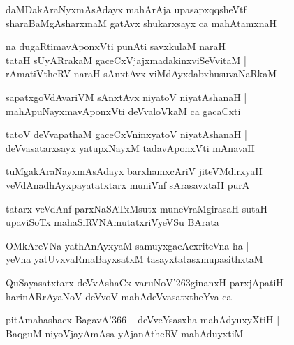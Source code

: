 \documentclass[twoside,12pt,openright]{book}
\def\S{\char'263}
\newcounter{shloka}[chapter]
\begin{document}
\begin{shloka}
daMDakAraNyxmAsAdayx mahArAja upasapxqqsheVtf |\\
sharaBaMgAsharxmaM gatAvx shukarxsayx ca mahAtamxnaH
\end{shloka}

\begin{shloka}
na dugaRtimavAponxVti punAti savxkulaM naraH ||\\
tataH sUyARrakaM gaceCxVjajxmadakinxviSeVvitaM |\\
rAmatiVtheRV naraH sAnxtAvx viMdAyxdabxhusuvaNaRkaM 
\end{shloka}

\begin{shloka}
sapatxgoVdAvariVM sAnxtAvx niyatoV niyatAshanaH |\\
mahApuNayxmavAponxVti deVvaloVkaM ca gacaCxti 
\end{shloka}

\begin{shloka}
tatoV deVvapathaM gaceCxVninxyatoV niyatAshanaH |\\
deVvasatarxsayx yatupxNayxM tadavAponxVti mAnavaH 
\end{shloka}

\begin{shloka}
tuMgakAraNayxmAsAdayx barxhamxcAriV jiteVMdirxyaH |\\
veVdAnadhAyxpayatatxtarx muniVnf sArasavxtaH purA
\end{shloka}

\begin{shloka}
tatarx veVdAnf parxNaSATxMsutx muneVraMgirasaH sutaH |\\
upaviSoTx mahaSiRVNAmutatxriVyeVSu BArata 
\end{shloka}

\begin{shloka}
OMkAreVNa yathAnAyxyaM samuyxgacAcxriteVna ha |\\
yeVna yatUvxvaRmaBayxsatxM tasayxtatasxmupasithxtaM
\end{shloka}

\begin{shloka}
QuSayasatxtarx deVvAshaCx varuNoV\S ginanxH parxjApatiH |\\
harinARrAyaNoV deVvoV mahAdeVvasatxtheYva ca 
\end{shloka}

\begin{shloka}
pitAmahashacx BagavA\char'366 ~ deVveYsasxha mahAdyuxyXtiH |\\
BaqguM niyoVjayAmAsa yAjanAtheRV mahAduyxtiM 
\end{shloka}
\end{document}
